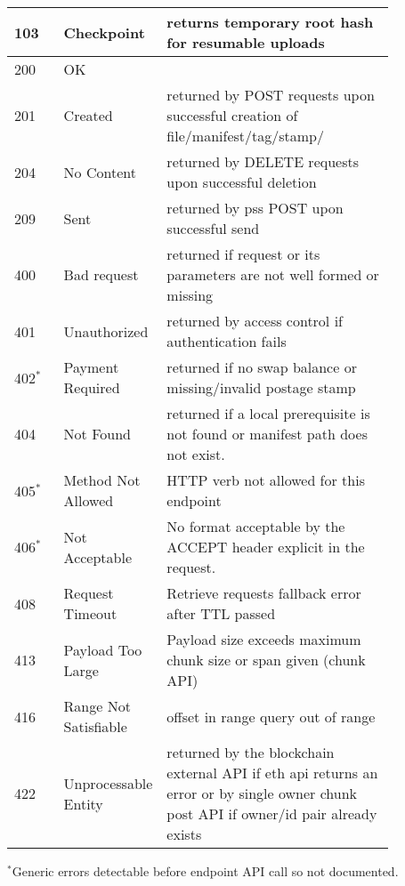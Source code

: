 \begin{definition}
\begin{lstlisting}
\end{lstlisting}
\begin{tabular}{l|p{0.25\linewidth}|p{0.6\linewidth}}
103 & Checkpoint & returns temporary root hash for resumable uploads
\\\hline
200 & OK &
\\
201 & Created & returned by POST requests upon successful creation of file/manifest/tag/stamp/\\
204 & No Content & returned by DELETE requests upon successful  deletion\\
209 & Sent & returned by pss POST upon successful send
\\\hline
400 & Bad request & returned if request or its parameters are not well formed or missing
\\
401 & Unauthorized & returned by access control if authentication fails
\\
402$^{*}$ & Payment Required & returned if no swap balance or missing/invalid postage stamp
\\     
404 & Not Found &
returned if a local prerequisite is not found or manifest path does not exist.
\\
405$^{*}$& Method Not Allowed & HTTP verb  not allowed for this endpoint
\\
406$^{*}$
%
& Not Acceptable & No format acceptable by the {ACCEPT} header explicit in the request. 
\\
408 & Request Timeout & Retrieve requests fallback error after TTL passed
\\
413 & Payload Too Large  &
Payload size exceeds maximum chunk size or span given (chunk API)
\\
416 & Range Not Satisfiable  & offset in range query out of range
\\
422 & Unprocessable Entity & returned by the blockchain external API if eth api returns an error or by single owner chunk post API if owner/id pair already exists
\end{tabular}

\footnotesize{$^{*}$Generic errors detectable before endpoint API call so not documented.}
\end{definition}


